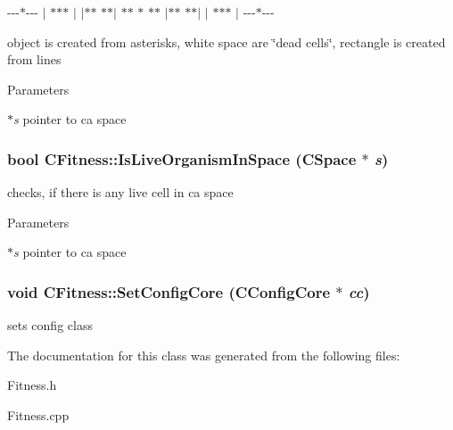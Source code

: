 -\/-\/-\/$\ast$-\/-\/-\/ $|$ $\ast$$\ast$$\ast$ $|$ $|$$\ast$$\ast$ $\ast$$\ast$$|$ $\ast$$\ast$ $\ast$ $\ast$$\ast$ $|$$\ast$$\ast$ $\ast$$\ast$$|$ $|$ $\ast$$\ast$$\ast$ $|$ -\/-\/-\/$\ast$-\/-\/-\/

object is created from asterisks, white space are \char`\"{}dead cells\char`\"{}, rectangle is created from lines


\begin{DoxyParams}{Parameters}
\item[{\em $\ast$s}]pointer to ca space \end{DoxyParams}
\hypertarget{classCFitness_a73dc0cc2da0fdceaf0901ffcbf2c95ab}{
\subsubsection[{IsLiveOrganismInSpace}]{\setlength{\rightskip}{0pt plus 5cm}bool CFitness::IsLiveOrganismInSpace ({\bf CSpace} $\ast$ {\em s})}}
\label{classCFitness_a73dc0cc2da0fdceaf0901ffcbf2c95ab}
checks, if there is any live cell in ca space


\begin{DoxyParams}{Parameters}
\item[{\em $\ast$s}]pointer to ca space \end{DoxyParams}
\hypertarget{classCFitness_a6843fde3ca6128f399ed79fb222ff631}{
\subsubsection[{SetConfigCore}]{\setlength{\rightskip}{0pt plus 5cm}void CFitness::SetConfigCore ({\bf CConfigCore} $\ast$ {\em cc})}}
\label{classCFitness_a6843fde3ca6128f399ed79fb222ff631}
sets config class 

The documentation for this class was generated from the following files:\begin{DoxyCompactItemize}
\item 
Fitness.h\item 
Fitness.cpp\end{DoxyCompactItemize}
